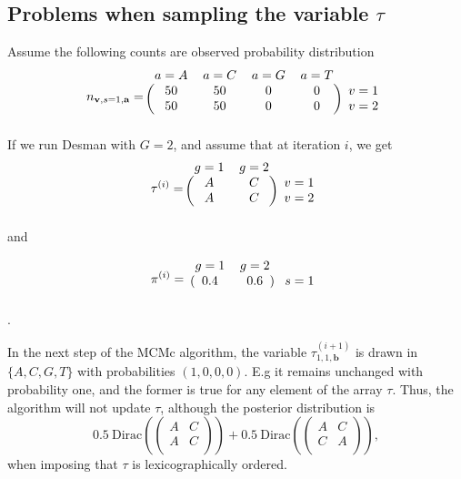 \documentclass{article}
\newcommand\indexvec[1]{\mathbf{#1}}
\begin{document}
\subsection{Problems when sampling the variable $\tau$}
Assume the following counts are observed probability distribution
$$n_{\indexvec{v},s=1,\indexvec{a}}=\begin{blockarray}{ccccc}
    a=A&a=C&a=G&a=T&\\
    \begin{block}{(cccc)c}
    50&50&0&0&v=1\\
    50&50&0&0&v=2\\
    \end{block}
\end{blockarray}$$
If we run Desman with $G=2$, and assume that at iteration $i$, we get 
$$\tau^{(i)}=\begin{blockarray}{ccc}
    g=1&g=2&\\
    \begin{block}{(cc)c}
    A&C&v=1\\
    A&C&v=2\\
    \end{block}
\end{blockarray}$$ and 

$$\pi^{(i)}=\begin{blockarray}{ccc}
    g=1&g=2&\\
    \begin{block}{(cc)c}
    0.4&0.6&s=1\\
    \end{block}
\end{blockarray}$$.

In the next step of the MCMc algorithm, the variable $\tau^{(i+1)}_{1,1,\indexvec{b}}$ is drawn in $\{A,C,G,T\}$ with probabilities
$(1,0,0,0)$. E.g it remains unchanged with probability one, and the former is true for any element of the array $\tau$. Thus, the algorithm will not update $\tau$, although the posterior distribution is $$0.5~\mathrm{Dirac}\left(\begin{pmatrix}
    A&C\\
    A&C\\
    \end{pmatrix}\right)+0.5~\mathrm{Dirac}\left(\begin{pmatrix}
    A&C\\
    C&A\\
    \end{pmatrix}\right),$$  when imposing that  $\tau$ is lexicographically ordered.
\end{document}
